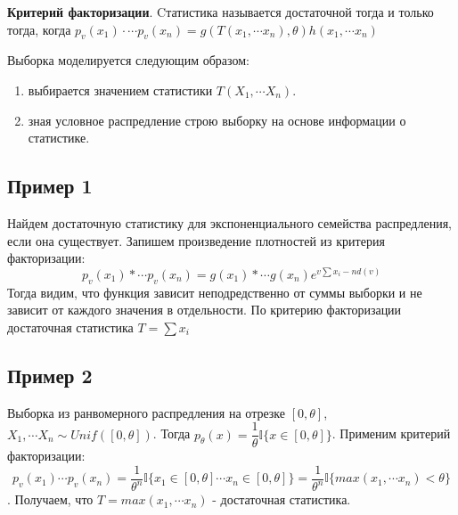 \documentclass[a4 paper]{article}
\begin{document}
\begin{ext}
\textbf{Критерий факторизации}. Cтатистика называется достаточной тогда и только тогда, когда $p_v(x_1) \cdot \cdots p_v(x_n) = g(T(x_1, \cdots x_n), \theta)h(x_1, \cdots x_n)$
\end{ext}


Выборка моделируется следующим образом:
\begin{enumerate}
    \item выбирается значением статистики $T(X_1, \cdots X_n)$.
    \item зная условное распредление строю выборку на основе информации о статистике.
\end{enumerate}

\subsection*{Пример 1}
Найдем достаточную статистику для экспоненциального семейства распредления, если она существует.
Запишем произведение плотностей из критерия факторизации:
$$p_v(x_1) * \cdots p_v(x_n) = g(x_1)* \cdots g(x_n) e^{v\sum x_i - n d(v)}$$
Тогда видим, что функция зависит неподредственно от суммы выборки и не зависит от каждого значения в отдельности. По критерию факторизации достаточная статистика $T = \sum x_i$

\subsection*{Пример 2}
Выборка из ранвомерного распредления на отрезке $[0, \theta]$, $X_1, \cdots X_n \sim Unif([0, \theta])$. Тогда $p_{\theta}(x) = \dfrac{1}{\theta}\mathbb{I}\{x \in [0, \theta]\}$.
Применим критерий факторизации:
$$p_v(x_1) \cdots p_v(x_n) = \dfrac{1}{\theta^n}\mathbb{I}\{x_1 \in [0,\theta] \cdots x_n \in [0, \theta]\} = \dfrac{1}{\theta^n}\mathbb{I}\{max(x_1, \cdots x_n) < \theta\}
$$. Получаем, что $T = max(x_1, \cdots x_n)$ - достаточная статистика.
\end{document}
